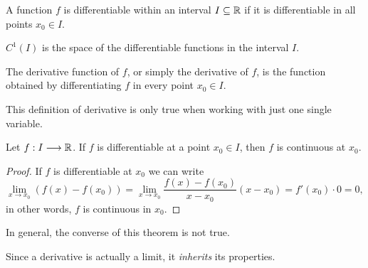 \begin{prop}
    A function $f$ is differentiable within an interval $I\subseteq\mathbb{R}$ if it is differentiable in all points
    $x_0\in I$.
\end{prop}

\begin{notation}
    $C^1\left( I \right)$ is the space of the differentiable functions in the interval $I$.
\end{notation}


\begin{defi}
    The derivative function of $f$, or simply the derivative of $f$, is the function obtained by differentiating
    $f$ in every point $x_0\in I$.
\end{defi}

\begin{remark}
    This definition of derivative is only true when working with just one single variable.
\end{remark}


\begin{prop}
    Let $f : I\longrightarrow \mathbb{R}$. If $f$ is differentiable at a point $x_0\in I$, then $f$ is continuous at $x_0$.
\end{prop}

\begin{proof}
    If $f$ is differentiable at $x_0$ we can write
    \begin{equation}
        \lim_{x\to x_0} \left( f\left( x \right) - f\left( x_0 \right) \right) = \lim_{x\to x_0}\frac{f\left( x \right)  - f\left( x_0 \right) }{x - x_0} \left( x - x_0 \right) = f'\left( x_0 \right) \cdot 0 = 0,
    \end{equation}
    in other words, $f$ is continuous in $x_0$.
\end{proof}

\noindent In general, the converse of this theorem is not true.

\noindent Since a derivative is actually a limit, it \textit{inherits} its properties.

